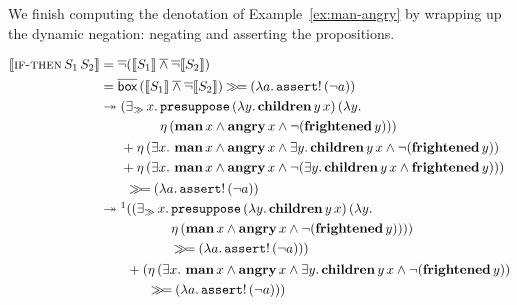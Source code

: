 We finish computing the denotation of Example~\ref{ex:man-angry} by
wrapping up the dynamic negation: negating and asserting the propositions.

\begin{align*}
  \sem{\app{\abs{if-then}}{S_1}{S_2}}
  &= \dnot (\sem{S_1} \dand \dnot \sem{S_2}) \\
  &= \ap{\DBOX}{(\sem{S_1} \dand \dnot \sem{S_2})} \hsbind (\lam{a}{\ap{\op{assert}!}{(\lnot a)}}) \\
  &\tto \begin{aligned}[t]
    &(\existsr x.\, \begin{aligned}[t]
         &\app{\op{presuppose}}{(\lam{y}{\app{\obj{children}}{y}{x}})}{(\lam{y}{ \\
         &\etaE{(\ap{\obj{man}}{x} \land \ap{\obj{angry}}{x} \land \lnot (\ap{\obj{frightened}}{y}))}})}
       \end{aligned} \\
    &+ \etaE{(\exists x.\ \ap{\obj{man}}{x} \land \ap{\obj{angry}}{x} \land
              \exists y.\, \app{\obj{children}}{y}{x} \land
              \lnot (\ap{\obj{frightened}}{y}))} \\
    &+ \etaE{(\exists x.\ \ap{\obj{man}}{x} \land \ap{\obj{angry}}{x} \land
              \lnot (\exists y.\, \app{\obj{children}}{y}{x} \land
              \ap{\obj{frightened}}{y}))})
    \end{aligned} \\
  &\qquad \hsbind (\lam{a}{\ap{\op{assert}!}{(\lnot a)}}) \\
  &\tto\footnotemark \begin{aligned}[t]
     &((\existsr x.\, \begin{aligned}[t]
         &\app{\op{presuppose}}{(\lam{y}{\app{\obj{children}}{y}{x}})}{(\lam{y}{ \\
         &\etaE{(\ap{\obj{man}}{x} \land \ap{\obj{angry}}{x} \land \lnot (\ap{\obj{frightened}}{y}))}})}) \\
         &\hsbind (\lam{a}{\ap{\op{assert}!}{(\lnot a)}})) \\
       \end{aligned} \\
     &+ (\begin{aligned}[t]
           &\etaE{(\exists x.\ \ap{\obj{man}}{x} \land \ap{\obj{angry}}{x} \land
                   \exists y.\, \app{\obj{children}}{y}{x} \land
                   \lnot (\ap{\obj{frightened}}{y}))} \\
           &\hsbind (\lam{a}{\ap{\op{assert}!}{(\lnot a)}}))

\end{aligned}
\end{aligned}
\end{align*}

